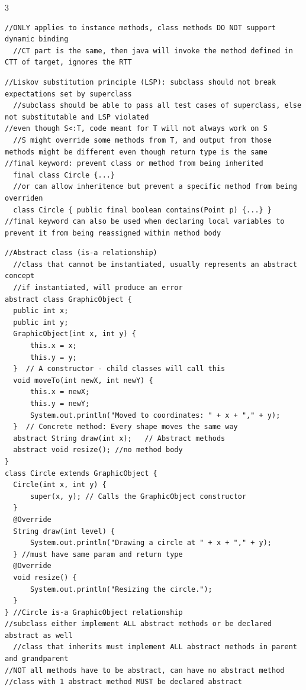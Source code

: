 \documentclass[10pt,a4paper]{article}
\begin{document}
\begin{multicols*}{3}
\begin{verbatim}
//ONLY applies to instance methods, class methods DO NOT support dynamic binding
  //CT part is the same, then java will invoke the method defined in CTT of target, ignores the RTT
\end{verbatim}
\begin{verbatim}
//Liskov substitution principle (LSP): subclass should not break expectations set by superclass
  //subclass should be able to pass all test cases of superclass, else not substitutable and LSP violated
//even though S<:T, code meant for T will not always work on S
  //S might override some methods from T, and output from those methods might be different even though return type is the same
//final keyword: prevent class or method from being inherited
  final class Circle {...}
  //or can allow inheritence but prevent a specific method from being overriden
  class Circle { public final boolean contains(Point p) {...} }
//final keyword can also be used when declaring local variables to prevent it from being reassigned within method body
\end{verbatim}
\begin{verbatim}
//Abstract class (is-a relationship)
  //class that cannot be instantiated, usually represents an abstract concept
  //if instantiated, will produce an error
abstract class GraphicObject {
  public int x;
  public int y;
  GraphicObject(int x, int y) {
      this.x = x;
      this.y = y;
  }  // A constructor - child classes will call this
  void moveTo(int newX, int newY) {
      this.x = newX;
      this.y = newY;
      System.out.println("Moved to coordinates: " + x + "," + y);
  }  // Concrete method: Every shape moves the same way
  abstract String draw(int x);   // Abstract methods
  abstract void resize(); //no method body
}
class Circle extends GraphicObject {
  Circle(int x, int y) {
      super(x, y); // Calls the GraphicObject constructor
  }
  @Override
  String draw(int level) {
      System.out.println("Drawing a circle at " + x + "," + y);
  } //must have same param and return type
  @Override
  void resize() {
      System.out.println("Resizing the circle.");
  }
} //Circle is-a GraphicObject relationship
//subclass either implement ALL abstract methods or be declared abstract as well
  //class that inherits must implement ALL abstract methods in parent and grandparent
//NOT all methods have to be abstract, can have no abstract method
//class with 1 abstract method MUST be declared abstract

\end{verbatim}
\end{multicols*}
\end{document}
